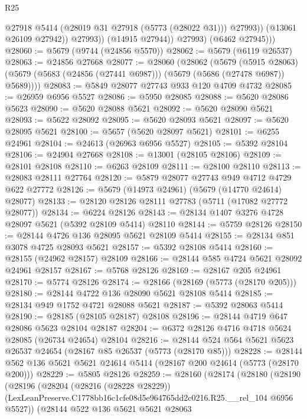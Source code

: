 \begin{lexlean}{R25}
\begin{coremodule}
                      @27918
                      @5414
                      (@28019 @31 @27918 (@5773 (@28022 @31)))
                      @27993))
                  (@13061 @26109 @27942))
                @27993))
            (@14915 @27944))
          @27993)
        (@6462 @27945)))
@28060 := @5679 (@9744 (@24856 @5570))
@28062 := @5679 (@6119 @26537)
@28063 := @24856 @27668
@28077 := @28060
    (@28062
      (@5679
        (@5915 @28063)
        (@5679 (@5683 (@24856 (@27441 @6987))) (@5679 (@5686 (@27478 @6987)) @5689))))
@28083 := @5849 @28077 @27743 @933 @120 @4709 @4732
@28085 := @26959 @6956 @5527
@28086 := @5950 @28085
@28088 := @5620 @28086 @5623
@28090 := @5620 @28088 @5621
@28092 := @5620 @28090 @5621
@28093 := @5622 @28092
@28095 := @5620 @28093 @5621
@28097 := @5620 @28095 @5621
@28100 := @5657 (@5620 @28097 @5621)
@28101 := @6255 @24961
@28104 := @24613 (@26963 @6956 @5527)
@28105 := @5392 @28104
@28106 := @24904 @27668
@28108 := @13001 (@28105 @28106)
@28109 := @28101 @28108
@28110 := @6263 @28109
@28111 := @28100 @28110
@28113 := @28083 @28111 @27764
@28120 := @5879 @28077 @27743 @949 @4712 @4729 @622 @27772
@28126 := @5679 (@14973 @24961) (@5679 (@14770 @24614) @28077)
@28133 := @28120 @28126 @28111 @27783 (@5711 (@17082 @27772 @28077))
@28134 := @6224 @28126
@28143 := @28134 @1407 @3276 @4728 @28097 @5621 (@5392 @28109 @5414) @28110
@28144 := @5759 @28126
@28150 := @28144 @4726 @136 @28095 @5621 @28109 @5414
@28155 := @28134 @851 @3078 @4725 @28093 @5621
@28157 := @5392 @28108 @5414
@28160 := @28155 (@24962 @28157) @28109
@28166 := @28144 @585 @4724 @5621 @28092 @24961 @28157
@28167 := @5768 @28126
@28169 := @28167 @205 @24961
@28170 := @5774 @28126
@28174 := @28166 (@28169 (@5773 (@28170 @205)))
@28180 := @28144 @4722 @136 @28090 @5621 @28108 @5414
@28185 := @28134 @949 @1752 @4721 @28088 @5621
@28187 := @5392 @28063 @5414
@28190 := @28185 (@28105 @28187) @28108
@28196 := @28144 @4719 @647 @28086 @5623 @28104 @28187
@28204 := @6372 @28126 @4716 @4718 @5624 @28085 (@26734 @24654) @28104
@28216 := @28144 @524 @564 @5621 @5623 @26537 @24654 (@28167 @85 @26537 (@5773 (@28170 @85)))
@28228 := @28144 @562 @136 @5621 @5621 @24614 @5414 (@28167 @200 @24614 (@5773 (@28170 @200)))
@28229 := @5805 @28126
@28259 := @28160
    (@28174
      (@28180
        (@28190
          (@28196
            (@28204
              (@28216 (@28228 @28229))
              (LexLeanPreserve.C1778bb16c1cfe08d5e964765dd2c0216.R25.__rel_104 @6956 @5527))
            (@28144
              @522
              @136
              @5621
              @5621
              @28063

\end{coremodule}
\end{lexlean}
